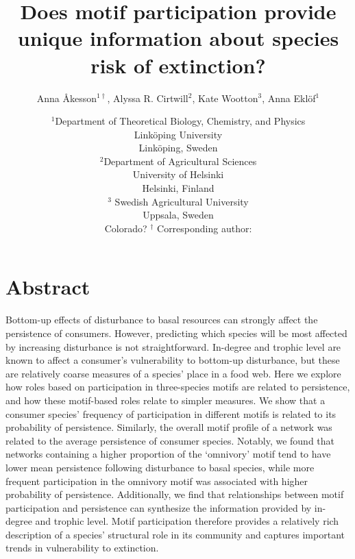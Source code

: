 \documentclass[12pt]{article}
\title{Does motif participation provide unique information about species risk of extinction?}
\author{Anna \r{A}kesson$^{1\dagger}$, Alyssa R. Cirtwill$^{2}$, Kate Wootton$^{3}$, Anna Ekl\"{o}f$^{1}$}
\date{\small$^1$Department of Theoretical Biology, Chemistry, and Physics\\ 
Link\"{o}ping University\\
Link\"{o}ping, Sweden\\
\medskip
\small$^2$Department of Agricultural Sciences\\
University of Helsinki\\
Helsinki, Finland\\
\medskip
\small$^3$ Swedish Agricultural University\\
Uppsala, Sweden\\
Colorado?
\medskip
$^\dagger$ Corresponding author:\\
}
\begin{document}
 
\maketitle 
\raggedright

\setlength{\parindent}{15pt} 



\section*{Abstract}


    Bottom-up effects of disturbance to basal resources can strongly affect the persistence of consumers.
    However, predicting which species will be most affected by increasing disturbance is not straightforward.
    In-degree and trophic level are known to affect a consumer's vulnerability to bottom-up disturbance, but these are relatively coarse measures of a species' place in a food web.
    Here we explore how roles based on participation in three-species motifs are related to persistence, and how these motif-based roles relate to simpler measures.
    We show that a consumer species' frequency of participation in different motifs is related to its probability of persistence. Similarly, the overall motif profile of a network was related to the average persistence of consumer species.
    Notably, we found that networks containing a higher proportion of the `omnivory' motif tend to have lower mean persistence following disturbance to basal species, while more frequent participation in the omnivory motif was associated with higher probability of persistence.
    Additionally, we find that relationships between motif participation and persistence can synthesize the information provided by in-degree and trophic level.
    Motif participation therefore provides a relatively rich description of a species' structural role in its community and captures important trends in vulnerability to extinction.
\end{document}
